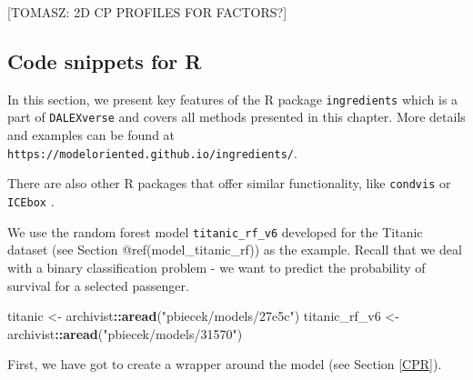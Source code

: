 \documentclass[12pt,]{krantz}
\newenvironment{Shaded}{\begin{snugshade}}{\end{snugshade}}
\newcommand{\DataTypeTok}[1]{\textcolor[rgb]{0.13,0.29,0.53}{#1}}
\newcommand{\DecValTok}[1]{\textcolor[rgb]{0.00,0.00,0.81}{#1}}
\newcommand{\KeywordTok}[1]{\textcolor[rgb]{0.13,0.29,0.53}{\textbf{#1}}}
\newcommand{\NormalTok}[1]{#1}
\newcommand{\OperatorTok}[1]{\textcolor[rgb]{0.81,0.36,0.00}{\textbf{#1}}}
\newcommand{\StringTok}[1]{\textcolor[rgb]{0.31,0.60,0.02}{#1}}
\theoremstyle{definition}
\theoremstyle{definition}
\theoremstyle{definition}
\theoremstyle{remark}
\begin{document}
{[}TOMASZ: 2D CP PROFILES FOR FACTORS?{]}

\hypertarget{ceterisParibus2R}{%
\subsection{Code snippets for R}\label{ceterisParibus2R}}

In this section, we present key features of the R package
\texttt{ingredients} \citep{ingredientsRPackage} which is a part of
\texttt{DALEXverse} and covers all methods presented in this chapter.
More details and examples can be found at
\texttt{https://modeloriented.github.io/ingredients/}.

There are also other R packages that offer similar functionality, like
\texttt{condvis} \citep{JSSv081i05} or \texttt{ICEbox}
\citep{ICEboxRPackage}.

We use the random forest model \texttt{titanic\_rf\_v6} developed for
the Titanic dataset (see Section @ref(model\_titanic\_rf)) as the
example. Recall that we deal with a binary classification problem - we
want to predict the probability of survival for a selected passenger.

\begin{Shaded}
\begin{Highlighting}[]
\NormalTok{titanic <-}\StringTok{ }\NormalTok{archivist}\OperatorTok{::}\KeywordTok{aread}\NormalTok{(}\StringTok{"pbiecek/models/27e5c"}\NormalTok{)}
\NormalTok{titanic_rf_v6 <-}\StringTok{ }\NormalTok{archivist}\OperatorTok{::}\KeywordTok{aread}\NormalTok{(}\StringTok{"pbiecek/models/31570"}\NormalTok{)}
\end{Highlighting}
\end{Shaded}

First, we have got to create a wrapper around the model (see Section
\ref{CPR}).

\begin{Shaded}
\end{Shaded}
\end{document}
